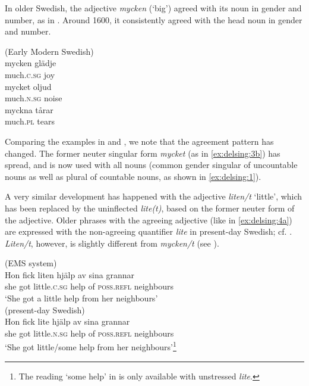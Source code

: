 \documentclass[output=paper]{langscibook}
\begin{document}
In older Swedish, the adjective \textit{mycken} (‘big’) agreed with its noun in gender and number, as in . Around 1600, it consistently agreed with the head noun in gender and number.


\ea(Early Modern Swedish)\\\label{ex:delsing:3}
\ea\label{ex:delsing:3a}
\gll mycken      glädje\\
much\textsc{.c.sg}    joy \\
\ex\label{ex:delsing:3b}
\gll mycket          oljud\\
    much\textsc{.n.sg}    noise \\
\ex\label{ex:delsing:3c}
\gll myckna      tårar \\
    much\textsc{.pl}  tears \\
\z
\z

Comparing the examples in  and , we note that the agreement pattern has changed. The former neuter singular form \textit{mycket} (as in \ref{ex:delsing:3b}) has spread, and is now used with all nouns (common gender singular of uncountable nouns as well as plural of countable nouns, as shown in \ref{ex:delsing:1}).\largerpage[2.5]



A very similar development has happened with the adjective \textit{liten/t} ‘little’, which has been replaced by the uninflected \textit{lite(t)}, based on the former neuter form of the adjective. Older phrases with the agreeing adjective (like in \ref{ex:delsing:4a}) are expressed with the non-agreeing quantifier \textit{lite} in present-day Swedish; cf. . \textit{Liten/t}, however, is  slightly different from \textit{mycken/t} (see ).


\ea\label{ex:delsing:4}
\ea\label{ex:delsing:4a}(EMS system)\\
\gll Hon  fick    liten        hjälp  av  sina          grannar\\
she      got  little.\textsc{c.sg}    help  of    \textsc{poss.refl}    neighbours\\
     \glt ‘She got a little help from her neighbours’\\

\ex\label{ex:delsing:4b}(present-day Swedish)\\
\gll Hon    fick    lite        hjälp    av  sina        grannar    \\
      she      got    little.\textsc{n.sg}  help    of  \textsc{poss.refl}  neighbours\\
      \glt ‘She got little/some help from her neighbours’\footnote{The reading ‘some help’ in  is only available with unstressed \textit{lite}.}\\
\z
\z
\end{document}
